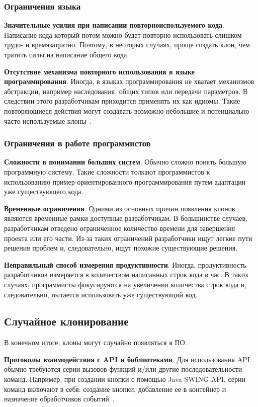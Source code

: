 \subsubsection{Ограничения языка}

\textbf{Значительные усилия при написании повторноиспользуемого кода}. Написание кода который потом можно будет повторно использовать слишком трудо- и времязатратно. Поэтому, в неоторых случаях, проще создать клон, чем тратить силы на написание общего кода.

\textbf{Отсутствие механизма повторного использования в языке программирования}. Иногда, в языках программирования не хватает механизмов абстракции, например наследования, общих типов или передачи параметров. В следствии этого разработчикам приходится применять их как идиомы. Такие повторяющиеся действия могут создавать возможно небольшие и потенциально часто используемые клоны~\cite{templates, javasys}.

\subsubsection{Ограничения в работе программистов}

\textbf{Сложности в понимании больших систем}. Обычно сложно понять большую программную систему. Такие сложности толкают программистов к использованию пример-ориентированного программирования путем адаптации уже существующего кода.

\textbf{Временные ограничения}. Одними из основных причин появления клонов являются временные рамки доступные разработчикам. В большинстве случаев, разработчикам отведено ограниченное количество времени для завершения проекта или его части. Из-за таких ограничений разработчики ищут легкие пути решения проблем и, следовательно, ищут похожие существующие решения. 

\textbf{Неправильный способ измерения продуктивности}. Иногда, продуктивность разработчиков измеряется в количеством написанных строк кода в час. В таких случаях, программисты фокусируются на увеличении количества строк кода и, следовательно, пытается использовать уже существующий код.

\subsection{Случайное клонирование}

В конечном итоге, клоны могут случайно появляться в ПО.

\textbf{Протоколы взаимодействия с API и библиотеками}. Для использования API обычно требуются серии вызовов функций и/или другие последовательности команд. Например, при создании кнопки с помощью Java SWING API, серии команд включают в себя: создание кнопки, добавление ее в контейнер и назначение обработчиков событий~\cite{fingerprints}.

